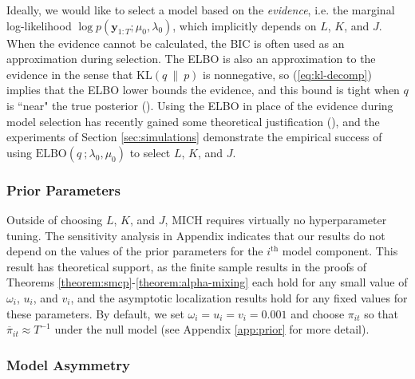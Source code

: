 Ideally, we would like to select a model based on the \textit{evidence}, i.e. the marginal log-likelihood $\log p(\mathbf{y}_{1:T}; \mu_0,\lambda_0)$, which implicitly depends on  $L$, $K$, and $J$. When the evidence cannot be calculated, the BIC is often used as an approximation during selection. The ELBO is also an approximation to the evidence in the sense that $\text{KL}(q \:\lVert\: p)$ is nonnegative, so (\ref{eq:kl-decomp}) implies that the ELBO lower bounds the evidence, and this bound is tight when $q$ is ``near" the true posterior (\citealp{Blei17}). Using the ELBO in place of the evidence during model selection has recently gained some theoretical justification (\citealp{Cherief18,Cherief19}), and the experiments of Section \ref{sec:simulations} demonstrate the empirical success of using $\text{ELBO}(q\:;\lambda_0, \mu_0)$ to select $L$, $K$, and $J$.

\subsubsection{Prior Parameters}

Outside of choosing $L$, $K$, and $J$, MICH requires virtually no hyperparameter tuning. The sensitivity analysis in Appendix  indicates that our results do not depend on the values of the prior parameters for the $i^{\text{th}}$ model component. This result has theoretical support, as the finite sample results in the proofs of Theorems \ref{theorem:smcp}-\ref{theorem:alpha-mixing} each hold for any small value of $\omega_i$, $u_i$, and $v_i$, and the asymptotic localization results hold for any fixed values for these parameters. By default, we set $\omega_i = u_i = v_i = 0.001$ and choose $\pi_{it}$ so that $\overline{\pi}_{it} \approx T^{-1}$ under the null model (see Appendix \ref{app:prior} for more detail).

\subsubsection{Model Asymmetry}

